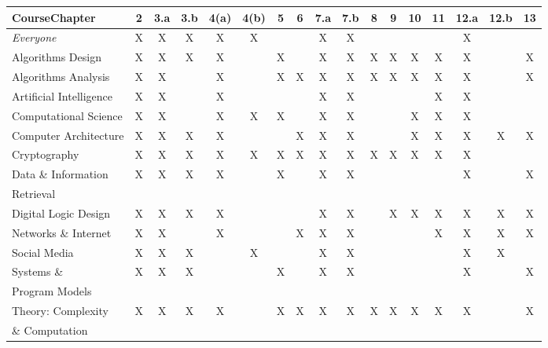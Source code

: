 \documentclass{article}
\begin{document}
\bigskip

{\scriptsize

\noindent
\begin{tabular}{|l||c|c|c|c|c|c|c|c|c|c|c|c|c|c|c|c|}
\hline
{\bf Course}{\bf Chapter}
   & 2 & 3.a & 3.b & 4(a) & 4(b) & 5 & 6 & 7.a & 7.b & 8 & 9 & 10 & 11 & 12.a & 12.b & 13 \\
\hline
\hline
{\em Everyone} 
   & X & X & X & X & X & &  & X & X &  &  &  &  & X & &  \\
\hline
Algorithms Design
   & X & X & X & X & & X &  & X & X & X & X & X & X & X & & X \\
\hline
Algorithms Analysis
   & X & X & & X & & X & X & X & X & X & X & X & X & X & & X \\
   \hline
Artificial Intelligence
   & X & X & & X &  & &  & X & X &  &  &  & X & X & &  \\
   \hline
Computational Science
   & X & X & & X & X & X &  & X & X &  &  & X & X & X &  &  \\
\hline
Computer Architecture 
   & X & X & X & X &  &  & X & X & X &  &  & X & X & X & X & X \\
\hline
Cryptography 
   & X & X & X & X & X & X & X & X & X & X & X & X & X & X & &  \\
\hline
Data \& Information 
   & X & X & X & X & & X &  & X & X &  &  &  &  & X & & X \\
Retrieval
    &  &  &  &  &  &  &  &  &  &  &  & &  &  & & \\
\hline
Digital Logic Design 
   & X & X & X & X &  &  &  & X & X &  & X & X & X & X & X & X \\
\hline
Networks \& Internet
   & X & X & & X & & & X & X & X &  &  &  & X & X & X & X \\
\hline
Social Media 
   & X & X & X &  & X &  &  & X & X &  &  &  &  & X & X &  \\
\hline
Systems \&     
  & X & X & X &  & & X &  & X & X &  &  &  &  & X & & X \\
Program Models &  &  & &  &  &  &  & &  &  &  &  &  &  &  & \\ 
\hline
Theory: Complexity 
   & X & X & X & X & & X & X & X & X & X & X & X & X & X & & X \\
\& Computation    &  &  &  &  &  &  &  & &  &  &  &  &  &  &  & \\
\hline
\end{tabular}
}
\end{document}
